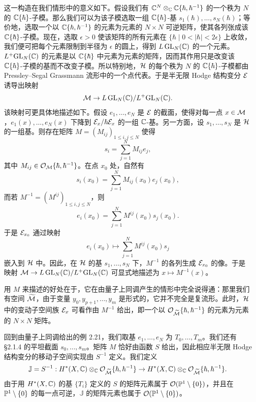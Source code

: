 这一构造在我们情形中的意义如下。假设我们有 $\mathbb{C}^N\otimes_{\mathbb{C}}\mathbb{C}\{\hbar,\hbar^{-1}\}$ 的一个秩为 $N$ 的 $\mathbb{C}\{\hbar\}$-子模。那么我们可以为该子模选取一组 $\mathbb{C}\{\hbar\}$-基 $s_1(\hbar),\dots,s_N(\hbar)$；等价地，选取一个以 $\mathbb{C}\{\hbar,\hbar^{-1}\}$ 的元素为元素的 $N\times N$ 可逆矩阵，使其各列张成该 $\mathbb{C}\{\hbar\}$-子模。现在，选取 $\epsilon>0$ 使该矩阵的所有元素在 $\{\hbar\mid0<|\hbar|<2\epsilon\}$ 上收敛，我们便可把每个元素限制到半径为
$\epsilon$ 的圆上，得到 $L\,\mathrm{GL}_N(\mathbb{C})$ 的一个元素。$L^+\mathrm{GL}_N(\mathbb{C})$ 的元素是以 $\mathbb{C}\{\hbar\}$ 中元素为元素的矩阵，因而其作用只是改变该 $\mathbb{C}\{\hbar\}$-子模的基而不改变子模。所以特别地，$\mathcal{H}$ 的每个秩为 $N$ 的 $\mathbb{C}\{\hbar\}$-子模都由 Pressley–Segal Grassmann 流形中的一个点代表。于是半无限 Hodge 结构变分 $\mathcal{E}$ 诱导出映射
\[
\mathcal{M}\to L\,\mathrm{GL}_N(\mathbb{C})/L^+\mathrm{GL}_N(\mathbb{C}).
\]
该映射可更具体地描述如下。假设 $e_1,\dots,e_N$ 是 $\mathcal{E}$ 的截面，使得对每一点 $x\in\mathcal{M}$，$e_1(x),\dots,e_N(x)$ 下降到 $\mathcal{E}_x/\hbar\mathcal{E}_x$ 的一组 $\mathbb{C}$-基。另一方面，设 $s_1,\dots,s_N$ 是 $\mathcal{H}$ 的一组基。则存在矩阵 $M=(M_{ij})_{1\le i,j\le N}$ 使得
\[
s_i=\sum_{j=1}^N M_{ij}e_j,
\]
其中 $M_{ij}\in\mathcal{O}_{\mathcal{M}}\{\hbar,\hbar^{-1}\}$。在点 $x_0$ 处，自然有
\[
s_i(x_0)=\sum_{j=1}^N M_{ij}(x_0)e_j(x_0),
\]
而若 $M^{-1}=(M^{ij})_{1\le i,j\le N}$，则
\[
e_i(x_0)=\sum_{j=1}^N M^{ij}(x_0)s_j(x_0).
\]
于是 $\mathcal{E}_{x_0}$ 通过映射
\[
e_i(x_0)\mapsto\sum_{j=1}^N M^{ij}(x_0)s_j
\]
嵌入到 $\mathcal{H}$ 中。因此，在 $\mathcal{H}$ 的基 $s_1,\dots,s_N$ 下，$M^{-1}$ 的各列生成 $\mathcal{E}_{x_0}$ 的像。于是映射 $\mathcal{M}\to L\,\mathrm{GL}_N(\mathbb{C})/L^+\mathrm{GL}_N(\mathbb{C})$ 可显式地描述为 $x\mapsto M^{-1}(x)$。

用 $M$ 来描述的好处在于，它在由量子上同调产生的情形中完全说得通：那里我们有空间 $\widetilde{\mathcal{M}}$，由于变量 $y_0,y_{p+1},\dots,y_m$ 是形式的，它并不完全是复流形。此时，$\mathcal{H}$ 中的变动子空间族 $\mathcal{E}_x$ 可看作由 $M^{-1}$ 给出，即一个以 $\mathcal{O}_{\widetilde{\mathcal{M}}}\{\hbar,\hbar^{-1}\}$ 的元素为元素的 $N\times N$ 矩阵。


\begin{example}
回到由量子上同调给出的例 2.21，我们取基 $e_1,\dots,e_N$ 为 $T_0,\dots,T_m$。我们还有 §2.1.4 的平坦截面 $s_0,\dots,s_m$。矩阵 $M$ 恰好由函数 $S$ 给出，因此相应半无限 Hodge 结构变分的移动子空间实现由 $S^{-1}$ 定义。我们定义
\[
\mathbb{J}=S^{-1}:H^*(X,\mathbb{C})\otimes_{\mathbb{C}}\mathcal{O}_{\widetilde{\mathcal{M}}}\{\hbar,\hbar^{-1}\}\to H^*(X,\mathbb{C})\otimes_{\mathbb{C}}\mathcal{O}_{\widetilde{\mathcal{M}}}\{\hbar,\hbar^{-1}\}.
\]
由于用 $H^*(X,\mathbb{C})$ 的基 $\{T_i\}$ 定义的 $S$ 的矩阵元素属于 $\mathcal{O}(\mathbb{P}^1\setminus\{0\})$，并且在 $\mathbb{P}^1\setminus\{0\}$ 的每一点可逆，$\mathbb{J}$ 的矩阵元素也属于 $\mathcal{O}(\mathbb{P}^1\setminus\{0\})$。
\end{example}

